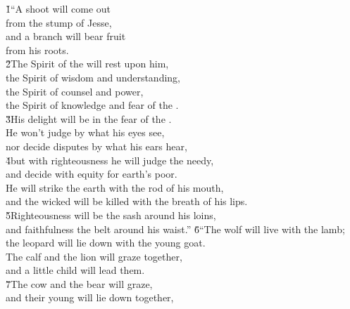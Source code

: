\begin{poetry}
\poeml {}
\v{1}``A shoot will come out \\
\poemll    from the stump of Jesse, \\
\poeml and a branch will bear fruit \\
\poemll    from his roots. \\
\poeml \v{2}The Spirit of the  will rest upon him, \\
\poemll    the Spirit of wisdom and understanding, \\
\poeml the Spirit of counsel and power, \\
\poemll    the Spirit of knowledge and fear of the . \\
\poeml \v{3}His delight will be in the fear of the . \\
\poemll    He won't judge by what his eyes see, \\
\poemlll       nor decide disputes by what his ears hear, \\
\poeml \v{4}but with righteousness he will judge the needy, \\
\poemll    and decide with equity for earth's poor. \\
\poeml He will strike the earth with the rod of his mouth, \\
\poemll    and the wicked will be killed with the breath of his lips. \\
\poeml \v{5}Righteousness will be the sash around his loins, \\
\poemll    and faithfulness the belt around his waist.''
\poeml \v{6}``The wolf will live with the lamb; \\
\poemll    the leopard will lie down with the young goat. \\
\poeml The calf and the lion will graze together, \\
\poemll    and a little child will lead them. \\
\poeml \v{7}The cow and the bear will graze, \\
\poemll    and their young will lie down together, \\

\end{poetry}
